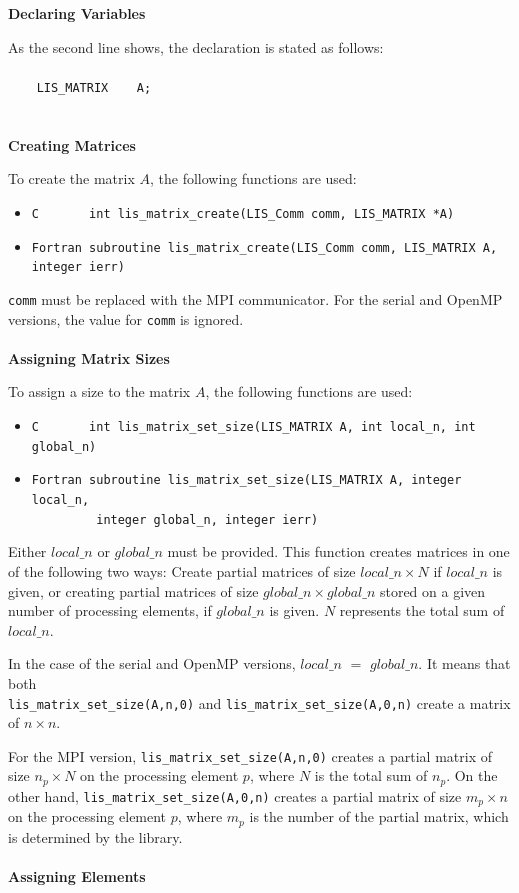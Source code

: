\documentclass[a4paper]{article}
\begin{document}
\\ \\
\noindent
{\bf Declaring Variables}

As the second line shows, the declaration is stated as follows:\\ \\
\verb|    LIS_MATRIX    A;|\\
\\ \\
\noindent
{\bf Creating Matrices}

To create the matrix $A$, the following functions are used: 
\begin{itemize}
\item \verb|C       int lis_matrix_create(LIS_Comm comm, LIS_MATRIX *A)|
\item \verb|Fortran subroutine lis_matrix_create(LIS_Comm comm, LIS_MATRIX A, integer ierr)|
\end{itemize}
{\tt comm} must be replaced with the MPI communicator. 
For the serial and OpenMP versions, the value for {\tt comm} is ignored.
\\ \\
\noindent
{\bf Assigning Matrix Sizes}

To assign a size to the matrix $A$, the following functions are used: 
\begin{itemize}
\item \verb|C       int lis_matrix_set_size(LIS_MATRIX A, int local_n, int global_n)|
\item \verb|Fortran subroutine lis_matrix_set_size(LIS_MATRIX A, integer local_n,|\\
      \verb|         integer global_n, integer ierr)|
\end{itemize}
Either $local\_n$ or $global\_n$ must be provided. 
This function creates matrices in one of the following two ways: 
Create partial matrices of size $local\_n \times N$ if $local\_n$ is given, or 
creating partial matrices of size $global\_n \times global\_n$
stored on a given number of processing elements, if $global\_n$ is 
given. $N$ represents the total sum of $local\_n$.

In the case of the serial and OpenMP versions, $local\_n$ $=$ $global\_n$. 
It means that both \\
\verb|lis_matrix_set_size(A,n,0)| and \verb|lis_matrix_set_size(A,0,n)|
create a matrix of $n \times n$.

For the MPI version, \verb|lis_matrix_set_size(A,n,0)| creates
a partial matrix of size $n_p \times N$ on the processing element $p$, 
where $N$ is the total sum of $n_p$. 
On the other hand, \verb|lis_matrix_set_size(A,0,n)| creates 
a partial matrix of size $m_p \times n$ on the processing element $p$, 
where $m_p$ is the number of the partial matrix, which is determined by the library.
\\ \\
\noindent
{\bf Assigning Elements}
\end{document}

